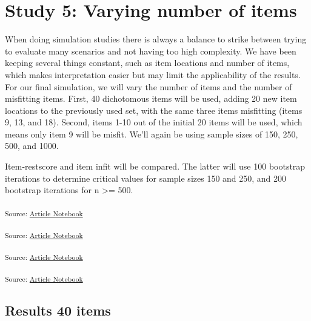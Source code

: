 \documentclass[
  letterpaper,
  DIV=11,
  numbers=noendperiod]{scrartcl}
\begin{document}
\section{Study 5: Varying number of
items}\label{study-5-varying-number-of-items}

When doing simulation studies there is always a balance to strike
between trying to evaluate many scenarios and not having too high
complexity. We have been keeping several things constant, such as item
locations and number of items, which makes interpretation easier but may
limit the applicability of the results. For our final simulation, we
will vary the number of items and the number of misfitting items. First,
40 dichotomous items will be used, adding 20 new item locations to the
previously used set, with the same three items misfitting (items 9, 13,
and 18). Second, items 1-10 out of the initial 20 items will be used,
which means only item 9 will be misfit. We'll again be using sample
sizes of 150, 250, 500, and 1000.

Item-restscore and item infit will be compared. The latter will use 100
bootstrap iterations to determine critical values for sample sizes 150
and 250, and 200 bootstrap iterations for n \textgreater= 500.

\textsubscript{Source:
\href{https://pgmj.github.io/rasch_itemfit/index.qmd.html}{Article
Notebook}}

\textsubscript{Source:
\href{https://pgmj.github.io/rasch_itemfit/index.qmd.html}{Article
Notebook}}

\textsubscript{Source:
\href{https://pgmj.github.io/rasch_itemfit/index.qmd.html}{Article
Notebook}}

\textsubscript{Source:
\href{https://pgmj.github.io/rasch_itemfit/index.qmd.html}{Article
Notebook}}

\subsection{Results 40 items}\label{results-40-items}
\end{document}
